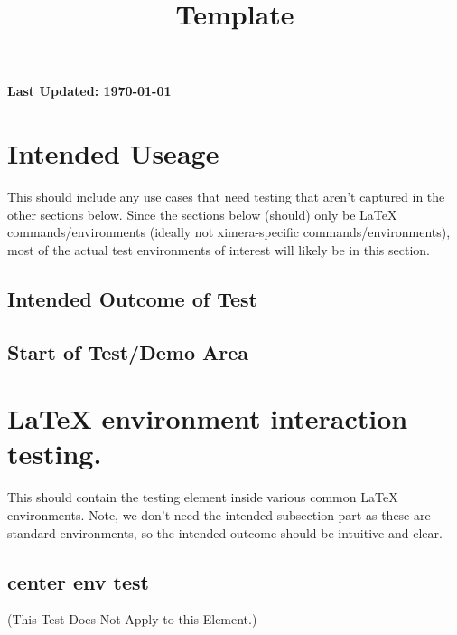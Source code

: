 \documentclass{ximera}
\title{Template}
\begin{document}
\begin{abstract}
    
\end{abstract}
\maketitle

{{\Huge \bfseries Last Updated: \today}} \\

\section{Intended Useage}
    This should include any use cases that need testing that aren't captured in the other sections below.
    Since the sections below (should) only be \LaTeX{} commands/environments (ideally not ximera-specific
    commands/environments), most of the actual test environments of interest will likely be in this section.

    \subsection{Intended Outcome of Test}


    \subsection{Start of Test/Demo Area}


\section{\LaTeX{} environment interaction testing.}
    This should contain the testing element inside various common \LaTeX{} environments.
    Note, we don't need the intended subsection part as these are standard environments,
    so the intended outcome should be intuitive and clear.

    \subsection{center env test}
        \begin{center}
            (This Test Does Not Apply to this Element.)
        \end{center}
\end{document}
